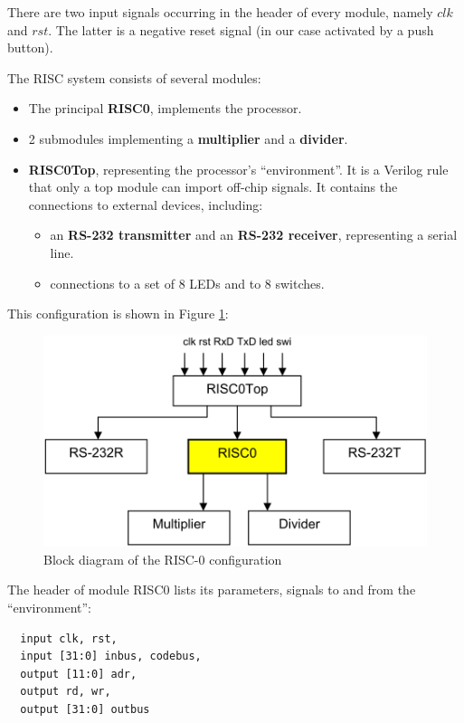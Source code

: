 There are two input signals occurring in the header of every module, namely $clk$ and $rst$. The latter is
a negative reset signal (in our case activated by a push button).

The RISC system consists of several modules:
\begin{itemize}
  \item The principal \textbf{RISC0}, implements the processor.
  \item 2 submodules implementing a \textbf{multiplier} and a \textbf{divider}.
  \item \textbf{RISC0Top}, representing the processor’s “environment”.
    It is a Verilog rule that only a top module can import off-chip signals.
    It contains the connections to external devices, including:
  \begin{itemize}
    \item an \textbf{RS-232 transmitter} and an \textbf{RS-232 receiver}, representing a serial line.
    \item connections to a set of 8 LEDs and to 8 switches.
  \end{itemize}
\end{itemize}
This configuration is shown in Figure \ref{fig:risc0}:
\begin{figure}[h!]
  \centering
  \includegraphics[width=.9\textwidth]{i/5.png}
  \caption{Block diagram of the RISC-0 configuration}
  \label{fig:risc0}
\end{figure}

The header of module RISC0 lists its parameters, signals to and from the “environment”:
\begin{verbatim}
  input clk, rst,
  input [31:0] inbus, codebus,
  output [11:0] adr,
  output rd, wr,
  output [31:0] outbus
\end{verbatim}

